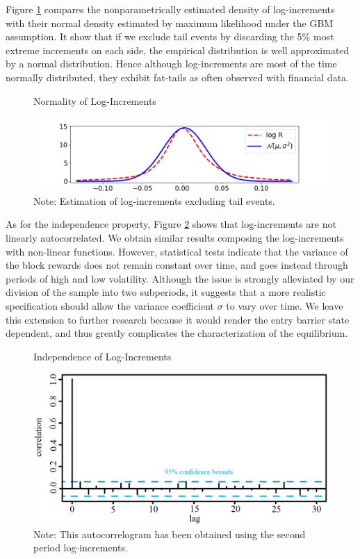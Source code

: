 \documentclass[12pt, a4paper]{article}
\begin{document}
Figure \ref{fig:test_GMB} compares the nonparametrically estimated density of log-increments
with their normal density estimated by maximum likelihood under the GBM assumption.
It show that if we exclude tail events by discarding
the 5\% most extreme increments on each side, the empirical distribution is well approximated by a normal distribution.
Hence although log-increments are  most of the time normally distributed, they exhibit fat-tails as often observed with financial data.

\begin{figure}[H]
\caption{Normality of Log-Increments}
\label{fig:test_GMB}\centering
\includegraphics[scale=0.62]{images/test_brownien.png}
\caption*{Note: Estimation of log-increments excluding tail events.}
\end{figure}


As for the independence property, Figure \ref{fig:indep_returns} shows that
log-increments are not linearly autocorrelated. We obtain similar
results composing the log-increments with non-linear functions. However, statistical tests
indicate that the variance of the block rewards does not remain constant over time, and goes instead through periods of high
and low volatility. Although the issue is strongly alleviated by our division of the sample
into two subperiods, it suggests that a more realistic specification should
allow the variance coefficient $\sigma$ to vary over time. We leave this
extension to further research because it would render the entry barrier state dependent, and
thus greatly complicates the characterization of the equilibrium.


\begin{figure}[H]
\caption{Independence of Log-Increments}
\label{fig:indep_returns}\centering
\includegraphics[scale=0.425]{images/autocorrelogramme} \flushleft
\caption*{Note: This autocorrelogram has been obtained using the second
period log-increments.}
\end{figure}
\end{document}
